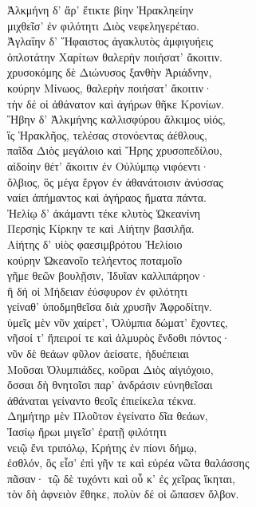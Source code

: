 \begin{pages}
\begin{Leftside}
\quad{}Ἀλκμήνη δ' ἄρ' ἔτικτε βίην Ἡρακληείην\\
μιχθεῖσ' ἐν φιλότητι Διὸς νεφεληγερέταο. \\

\quad{}Ἀγλαΐην δ' Ἥφαιστος ἀγακλυτὸς ἀμφιγυήεις  \\
ὁπλοτάτην Χαρίτων θαλερὴν ποιήσατ' ἄκοιτιν.\\

\quad{}χρυσοκόμης δὲ Διώνυσος ξανθὴν Ἀριάδνην,\\
κούρην Μίνωος, θαλερὴν ποιήσατ' ἄκοιτιν· \\
τὴν δέ οἱ ἀθάνατον καὶ ἀγήρων θῆκε Κρονίων.\\

\quad{}Ἥβην δ' Ἀλκμήνης καλλισφύρου ἄλκιμος υἱός,  \\
ἲς Ἡρακλῆος, τελέσας στονόεντας ἀέθλους,\\
παῖδα Διὸς μεγάλοιο καὶ Ἥρης χρυσοπεδίλου,\\
αἰδοίην θέτ' ἄκοιτιν ἐν Οὐλύμπῳ νιφόεντι· \\
ὄλβιος, ὃς μέγα ἔργον ἐν ἀθανάτοισιν ἀνύσσας\\
ναίει ἀπήμαντος καὶ ἀγήραος ἤματα πάντα. \\

\quad{}Ἠελίῳ δ' ἀκάμαντι τέκε κλυτὸς Ὠκεανίνη \\
Περσηὶς Κίρκην τε καὶ Αἰήτην βασιλῆα.\\
Αἰήτης δ' υἱὸς φαεσιμβρότου Ἠελίοιο\\
κούρην Ὠκεανοῖο τελήεντος ποταμοῖο\\
γῆμε θεῶν βουλῇσιν, Ἰδυῖαν καλλιπάρηον· \\
ἣ δή οἱ Μήδειαν ἐύσφυρον ἐν φιλότητι\\
γείναθ' ὑποδμηθεῖσα διὰ χρυσῆν Ἀφροδίτην. \\

{\minion\Para}
ὑμεῖς μὲν νῦν χαίρετ', Ὀλύμπια δώματ' ἔχοντες, \\
νῆσοί τ' ἤπειροί τε καὶ ἁλμυρὸς ἔνδοθι πόντος· \\
νῦν δὲ θεάων φῦλον ἀείσατε, ἡδυέπειαι \\
Μοῦσαι Ὀλυμπιάδες, κοῦραι Διὸς αἰγιόχοιο,\\
ὅσσαι δὴ θνητοῖσι παρ' ἀνδράσιν εὐνηθεῖσαι\\
ἀθάναται γείναντο θεοῖς ἐπιείκελα τέκνα.\\

\quad{}Δημήτηρ μὲν Πλοῦτον ἐγείνατο δῖα θεάων,\\
Ἰασίῳ ἥρωι μιγεῖσ' ἐρατῇ φιλότητι  \\
νειῷ ἔνι τριπόλῳ, Κρήτης ἐν πίονι δήμῳ,\\
ἐσθλόν, ὃς εἶσ' ἐπὶ γῆν τε καὶ εὐρέα νῶτα θαλάσσης\\
πᾶσαν· τῷ δὲ τυχόντι καὶ οὗ κ' ἐς χεῖρας ἵκηται, \\
τὸν δὴ ἀφνειὸν ἔθηκε, πολὺν δέ οἱ ὤπασεν ὄλβον.\\


\end{Leftside}
\end{pages}
